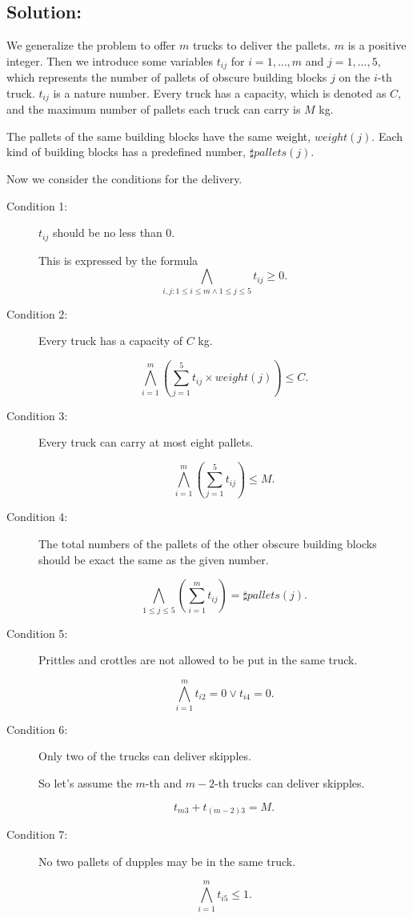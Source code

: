 \documentclass[11pt]{article}
\begin{document}
\vspace{4mm}

\subsection*{Solution:}

We generalize the problem to offer $m$ trucks to deliver the pallets. $m$ is a positive integer. Then we introduce some variables $t_{ij}$ for $i = 1, ..., m$ and $j = 1,...,5$, which represents the number of pallets of obscure building blocks $j$ on the $i$-th truck. $t_{ij}$ is a nature number. Every truck has a capacity, which is denoted as $C$, and the maximum number of pallets each truck can carry is $M$ kg.

The pallets of the same building blocks have the same weight, $weight(j)$. Each kind of building blocks has a predefined number, $\sharp pallets(j)$.

Now we consider the conditions for the delivery.

\begin{description}
  \item[Condition 1:] $t_{ij}$ should be no less than $0$.

  This is expressed by the formula
  \[ \bigwedge_{i,j:1 \leq i \leq m \wedge 1 \leq j \leq 5} t_{ij} \geq 0.\]
  \item[Condition 2:] Every truck has a capacity of $C$ kg.

  \[ \bigwedge_{i=1}^m  (\sum_{j=1}^5 t_{ij} \times weight(j)) \leq C .\]
  \item[Condition 3:] Every truck can carry at most eight pallets.

  \[ \bigwedge_{i=1}^m (\sum_{j=1}^5 t_{ij}) \leq M .\]
  \item[Condition 4:] The total numbers of the pallets of the other obscure building blocks should be exact the same as the given number.

  \[ \bigwedge_{1\leq j \leq 5} (\sum_{i=1}^m t_{ij}) = \sharp pallets(j) .\]

  \item[Condition 5:] Prittles and crottles are not allowed to be put in the same truck.

  \[ \bigwedge_{i=1}^m t_{i2}=0 \vee t_{i4}=0 .\]
  \item[Condition 6:] Only two of the trucks can deliver skipples.

      So let's assume the $m$-th and $m-2$-th trucks can deliver skipples.

  \[ t_{m3} + t_{(m-2)3} = M .\]
  \item[Condition 7:] No two pallets of dupples may be in the same truck.

  \[ \bigwedge_{i=1}^m t_{i5} \leq 1 .\]
\end{description}
\end{document}
